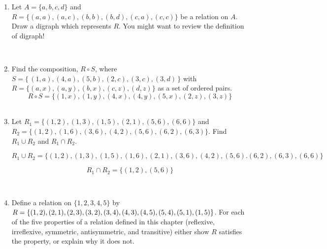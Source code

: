 \documentclass[11pt]{amsart}
\begin{document}
\begin{enumerate}

\item  Let $A=\{a,b,c,d\}$ and $R=\{(a,a),(a,c), (b,b), (b,d),(c,a),(c,c)\}$ be a relation
on $A$. Draw a digraph which represents $R$. You might want to review the definition of digraph!\\[5pt]

{\color{blue}
}\\[5pt]


\item Find the composition, $R\circ S$,  where $S = \{\,(1,a), (4,a),
(5,b), (2,c),  (3,c), (3,d)\,\}$ with $R  =\{(a,x),(a,y),(b,x),(c,z),(d,z)\}$ as a set of ordered pairs.\\[5pt]
{\color{blue} 
\[
R\circ S = \{ (1,x), (1,y), (4,x), (4,y), (5,x), (2,z), (3,z)\}
\]
}\\[5pt]

\item Let $R_1=\{(1,2), (1,3), (1,5), (2,1), (5,6), (6,6)\}$ and\\
$R_2=\{(1,2),(1,6), (3,6), (4,2), (5,6), (6,2), (6,3)\}$. Find $R_1\cup R_2$ and $R_1\cap R_2$. \\[5pt]

{\color{blue}
\[
R_1\cup R_2 = \{ (1,2), (1,3) , (1,5), (1,6), (2,1), (3,6), (4,2), (5,6).(6,2), (6,3), (6,6) \}
\]

\[
 R_1\cap R_2 = \{ (1,2), (5,6) \}
\]
}\\[5pt]

\item Define a relation on $\{1,2,3,4,5\}$ by $R=\{(1,2),(2,1),(2,3),(3,2),(3,4),(4,3),\\
(4,5),(5,4),(5,1),(1,5)\}$. For each of the five properties of a relation defined in this chapter 
(reflexive, irreflexive, symmetric, antisymmetric, and transitive) 
either show $R$ satisfies the property, or explain why it does not.
\\[5pt]


\end{enumerate}
\end{document}

